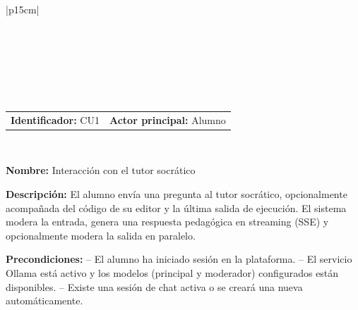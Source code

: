 \begingroup
{} %
\setlength{\arrayrulewidth}{1pt}
\begin{longtable}{|p{15cm}|}
  
  \hline
   \\
  \hline
  \endfirsthead
  
   \\
  \hline
   \\
  \hline
  \endhead
  
  \hline {} \\ \hline
  \endfoot
  
  \hline
  \caption{Caso de Uso CU1 — Interacción con el Tutor Socrático.}
  \label{TB:CU1_TUTOR}
  \endlastfoot

  \begin{tabularx}{\linewidth}{@{}X X@{}}
    \textbf{Identificador:} CU1 & \textbf{Actor principal:} Alumno 
  \end{tabularx} \\ \hline

  \textbf{Nombre:} Interacción con el tutor socrático \\ \hline

  \textbf{Descripción:} \newline 
  El alumno envía una pregunta al tutor socrático, opcionalmente acompañada del código de su editor y la última salida de ejecución. El sistema modera la entrada, genera una respuesta pedagógica en streaming (SSE) y opcionalmente modera la salida en paralelo. \\ \hline

  \textbf{Precondiciones:} \newline
  -- El alumno ha iniciado sesión en la plataforma. \newline
  -- El servicio Ollama está activo y los modelos (principal y moderador) configurados están disponibles. \newline
  -- Existe una sesión de chat activa o se creará una nueva automáticamente. \\ \hline


\end{longtable}
